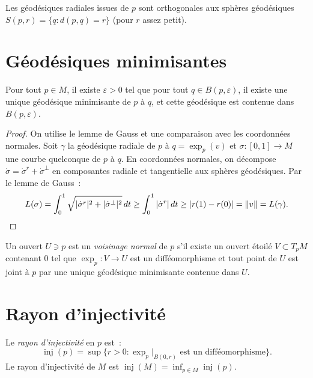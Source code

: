 \begin{corollaire}
Les g\'eod\'esiques radiales issues de $p$ sont orthogonales aux sph\`eres
g\'eod\'esiques $S(p, r) = \{q : d(p,q) = r\}$ (pour $r$ assez petit).
\end{corollaire}

\section{G\'eod\'esiques minimisantes}

\begin{theoreme}
\label{thm:geod_min}
Pour tout $p \in M$, il existe $\varepsilon > 0$ tel que pour tout $q \in B(p, \varepsilon)$,
il existe une unique g\'eod\'esique minimisante de $p$ \`a $q$, et cette g\'eod\'esique
est contenue dans $B(p, \varepsilon)$.
\end{theoreme}

\begin{proof}
On utilise le lemme de Gauss et une comparaison avec les coordonn\'ees normales.
Soit $\gamma$ la g\'eod\'esique radiale de $p$ \`a $q = \exp_p(v)$ et $\sigma : [0,1] \to M$
une courbe quelconque de $p$ \`a $q$. En coordonn\'ees normales, on d\'ecompose
$\dot\sigma = \dot\sigma^r + \dot\sigma^\perp$ en composantes radiale et tangentielle
aux sph\`eres g\'eod\'esiques. Par le lemme de Gauss~:
\[
    L(\sigma) = \int_0^1 \sqrt{|\dot\sigma^r|^2 + |\dot\sigma^\perp|^2}\, dt
    \geq \int_0^1 |\dot\sigma^r|\, dt \geq |r(1) - r(0)| = \left\| v \right\| = L(\gamma).
\]
\end{proof}

\begin{definition}
Un ouvert $U \ni p$ est un \emph{voisinage normal} de $p$ s'il existe un ouvert
\'etoil\'e $V \subset T_pM$ contenant $0$ tel que $\exp_p : V \to U$ est un
diff\'eomorphisme et tout point de $U$ est joint \`a $p$ par une unique g\'eod\'esique
minimisante contenue dans $U$.
\end{definition}

\section{Rayon d'injectivit\'e}

\begin{definition}
Le \emph{rayon d'injectivit\'e} en $p$ est~:
\[
    \operatorname{inj}(p) = \sup\{r > 0 : \exp_p|_{B(0,r)} \text{ est un diff\'eomorphisme}\}.
\]
Le rayon d'injectivit\'e de $M$ est $\operatorname{inj}(M) = \inf_{p \in M} \operatorname{inj}(p)$.
\end{definition}

